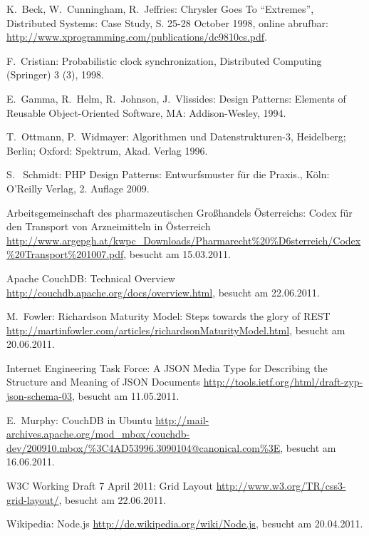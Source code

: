\begin{thebibliography}{99}

	K.\ Beck, W.\ Cunningham, R.\ Jeffries:
	Chrysler Goes To ``Extremes'',
	Distributed Systems: Case Study, S. 25-28 October 1998,
	online abrufbar: \url{http://www.xprogramming.com/publications/dc9810cs.pdf}.

	F.\ Cristian:
	Probabilistic clock synchronization,
	Distributed Computing (Springer) 3 (3), 1998.

  E.\ Gamma, R.\ Helm, R.\ Johnson, J.\ Vlissides:
    Design Patterns: Elements of Reusable Object-Oriented Software,
	MA: Addison-Wesley, 1994.
	
  T.\ Ottmann, P.\ Widmayer:
	Algorithmen und Datenstrukturen-3,
	Heidelberg; Berlin; Oxford: Spektrum, Akad. Verlag 1996.

  S. \ Schmidt:
	PHP Design Patterns: Entwurfsmuster für die Praxis.,
	Köln: O'Reilly Verlag, 2. Auflage 2009.


\hspace{-\leftmargin}{\Large\bfseries Web-Referenzen} %

	Arbeitsgemeinschaft des pharmazeutischen Großhandels Österreichs:
	Codex für den Transport von Arzneimitteln in Österreich
	\url{http://www.argepgh.at/kwpc_Downloads/Pharmarecht%20%D6sterreich/Codex%20Transport%201007.pdf},
	besucht am 15.03.2011.

	Apache CouchDB:
	Technical Overview
	\url{http://couchdb.apache.org/docs/overview.html},
	besucht am 22.06.2011.

	M.\ Fowler:
	Richardson Maturity Model: Steps towards the glory of REST
	\url{http://martinfowler.com/articles/richardsonMaturityModel.html},
	besucht am 20.06.2011.
	
	Internet Engineering Task Force:
	A JSON Media Type for Describing the Structure and Meaning of JSON Documents
	\url{http://tools.ietf.org/html/draft-zyp-json-schema-03},
	besucht am 11.05.2011.

	E.\ Murphy:
	CouchDB in Ubuntu
	\url{http://mail-archives.apache.org/mod_mbox/couchdb-dev/200910.mbox/%3C4AD53996.3090104@canonical.com%3E}, besucht am 16.06.2011.

	W3C Working Draft 7 April 2011:
	Grid Layout
	\url{http://www.w3.org/TR/css3-grid-layout/}, besucht am 22.06.2011.

  Wikipedia: Node.js
    \url{http://de.wikipedia.org/wiki/Node.js}, besucht am 20.04.2011.
	

\end{thebibliography}